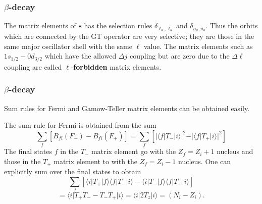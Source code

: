\documentclass{beamer}
\begin{document}
\begin{frame}
\frametitle{$\beta$-decay}

\begin{block}{}
The matrix elements of $\mathbf{s}$ has the selection rules $\delta_{ \ell_{a} , \ell_{b} }$
and $\delta_{n _{a} ,n _{b} }$. Thus the orbits which are connected by the GT operator
are very selective; they are those in the same major oscillator shell
with the same $\ell$ value. The matrix elements such as
$1s_{1/2}-0d_{3/2}$ which have the allowed $\Delta j$ coupling but
are zero due to the $\Delta\ell$ coupling are called $\ell$-\textbf{forbidden} matrix
elements.
\end{block}
\end{frame}

\begin{frame}
\frametitle{$\beta$-decay}

\begin{block}{}
Sum rules for Fermi and Gamow-Teller matrix elements can be obtained easily.

The sum rule for Fermi is obtained from the sum
\[
\sum _{f} \left[ B_{fi}(F_{-}) - B_{fi}(F_{+}) \right]
=\sum _{f} \left[ \vert \langle f\vert  T_{-} \vert i\rangle\vert ^{2} -  \vert \langle f\vert  T_{+} \vert 
i\rangle\vert ^{2} \right]
\]
The final states $f$ in the $T_{-}$ matrix element go
with the $Z_{f}=Z_{i}+1$ nucleus and those in the $T_{+}$ matrix element
to with the $Z_{f}=Z_{i}-1$ nucleus. One can explicitly sum over the
final states to obtain
\[
\sum _{f} \left[ \langle i\vert  T_{+} \vert f\rangle \langle f\vert T_{-}\vert i\rangle -  \langle i\vert  T_{-} \vert f\rangle \langle f\vert T_{+}\vert i\rangle \right]
\]
\[
= \langle i\vert  T_{+} T_{-} -  T_{-} T_{+}\vert i\rangle =\langle i\vert  2T_{z}\vert i\rangle  = (N_{i}-Z_{i}).       
\]
\end{block}
\end{frame}
\end{document}
